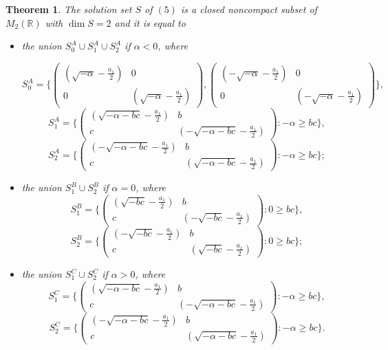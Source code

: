 \documentclass[12pt]{amsart}
\theoremstyle{plain}
\newtheorem{thm}{Theorem}[section]
\theoremstyle{definition}
\begin{document}
\begin{thm} \label{thm} The solution set $S$ of $(5)$ is a closed noncompact subset of $M_2(\mathbb R)$ with $\dim S = 2$ and it is equal to 
\begin{itemize}
\item[(A)] the union
$S^A_0 \cup S^A_1 \cup S^A_2$ if $\alpha < 0$, where 

$$S^A_0 = \{\left(\begin{array}{rr}  (\sqrt{-\alpha}-  \frac{a_1}{2}) & 0 \\ 0 & (\sqrt{-\alpha}-  \frac{a_1}{2})  \end{array}\right),
\left(\begin{array}{rr}  (-\sqrt{-\alpha}-  \frac{a_1}{2}) & 0 \\ 0 & (-\sqrt{-\alpha}-  \frac{a_1}{2})  \end{array}\right)\},$$
$$S^A_1 = \{\left(\begin{array}{rr}  (\sqrt{-\alpha-bc}- \frac{a_1}{2}) & b \\ c & (-\sqrt{-\alpha-bc}-  \frac{a_1}{2})  \end{array}\right): 
-\alpha \geq bc \},$$
$$S^A_2 = \{\left(\begin{array}{rr}  (-\sqrt{-\alpha-bc}-  \frac{a_1}{2}) & b \\ c & (\sqrt{-\alpha-bc}-  \frac{a_1}{2})  \end{array}\right): 
-\alpha \geq bc\};$$
\item[(B)] the union
$S^B_1 \cup S^B_2$ if $\alpha = 0$, where 
$$S^B_1 = \{\left(\begin{array}{rr}  (\sqrt{-bc}- \frac{a_1}{2}) & b \\ c & (-\sqrt{-bc}- \frac{a_1}{2})  \end{array}\right): 0 \geq bc\},$$
$$S^B_2 = \{\left(\begin{array}{rr}  (-\sqrt{-bc}- \frac{a_1}{2}) & b \\ c & (\sqrt{-bc}- \frac{a_1}{2})  \end{array}\right): 0 \geq bc \};$$
\item[(C)]  the union
$S^C_1 \cup S^C_2$ if $\alpha > 0$, where 
$$S^C_1 = \{\left(\begin{array}{rr}  (\sqrt{-\alpha-bc}- \frac{a_1}{2}) & b \\ c & (-\sqrt{-\alpha-bc}- \frac{a_1}{2})  \end{array}\right):  -\alpha \geq bc\},$$
$$S^C_2 = \{\left(\begin{array}{rr}  (-\sqrt{-\alpha-bc}- \frac{a_1}{2}) & b \\ c & (\sqrt{-\alpha-bc}- \frac{a_1}{2})  \end{array}\right):  -\alpha \geq bc \}.$$
\end{itemize}


\end{thm}
\end{document}
